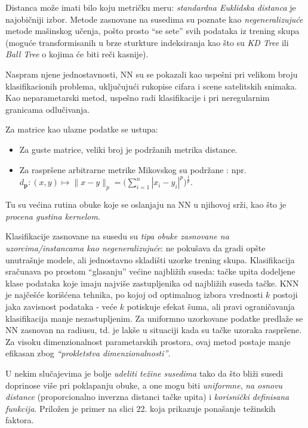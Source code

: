 \documentclass[fontsize=12bp, paper=a4]{scrarticle}
\begin{document}
Distanca može imati bilo koju metričku meru: \textit{standardna Euklidska distanca} je najobičniji izbor. Metode zasnovane na susedima su poznate kao \textit{negeneralizujuće} metode mašinskog učenja, pošto prosto ``se sete'' svih podataka iz trening skupa (moguće transformisanih u brze sturkture indeksiranja kao što su \textit{KD Tree} ili \textit{Ball Tree} o kojima će biti reči kasnije). 

Naspram njene jednostavnosti, NN su se pokazali kao uspešni pri velikom broju klasifikacionih problema, uključujući rukopise cifara i scene satelitskih snimaka. Kao neparametarski metod, uspešno radi klasifikacije i pri neregularnim granicama odlučivanja.

Za matrice kao ulazne podatke se ustupa:
\begin{itemize}
    \item Za guste matrice, veliki broj je podržanih metrika distance.
    \item Za raspršene arbitrarne metrike Mikovskog su podržane : npr. $d_{\mathbf{p}} : (x, y) \mapsto \|x-y\|_p = \bigg(\sum_{i=1}^{n} |x_i-y_i|^p\bigg)^\frac{1}{p}$.\cite{minkowski}\cite{distance}
\end{itemize}

Tu su većina rutina obuke koje se oslanjaju na NN u njihovoj srži, kao što je \textit{procena gustina kernelom}. 

Klasifikacije zasnovane na susedu su \textit{tipa obuke zasnovane na uzorcima/instancama kao negeneralizujuće}: ne pokušava da gradi opšte unutrašnje modele, ali jednostavno skladišti uzorke trening skupa. Klasifikacija sračunava po prostom ``glasanju'' većine najbližih suseda: tačke upita dodeljene klase podataka koje imaju najviše zastupljenika od najbližih suseda tačke. 
KNN je najčešće korišćena tehnika, po kojoj od optimalnog izbora vrednosti $k$ postoji jaka zavisnost podataka - veće $k$ potiskuje efekat šuma, ali pravi ograničavanja klasifikacija manje nezastupljenim. 
Za uniformno uzorkovane podatke predlaže se NN zasnovan na radiusu, td. je lakše u situaciji kada su tačke uzoraka raspršene. Za visoku dimenzionalnost parametarskih prostora, ovaj metod postaje manje efikasan zbog \textit{``prokletstva dimenzionalnosti''}.


U nekim slučajevima je bolje \textit{udeliti težine susedima} tako da što bliži susedi doprinose više pri poklapanju obuke, a one mogu biti \textit{uniformne}, \textit{na osnovu distance} (proporcionalno inverzna distanci tačke upita) i \textit{korisnički definisana funkcija}. Priložen je primer na slici 22. koja prikazuje ponašanje težinskih faktora.
\end{document}
